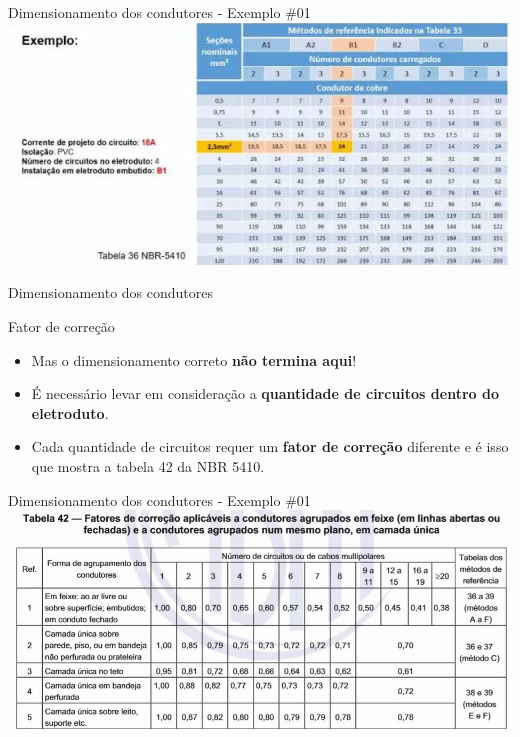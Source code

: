
\begin{frame}{Dimensionamento dos condutores - Exemplo \#01}
	\centering
	\includegraphics[width=1\linewidth]{Figuras/Ch06/fig6}
\end{frame}


\begin{frame}{Dimensionamento dos condutores}
	\begin{block}{Fator de correção}
		\begin{itemize}
			\item Mas o dimensionamento correto \textbf{não termina aqui}!
			\item É necessário levar em consideração a \textbf{quantidade de circuitos dentro do eletroduto}.
			\item Cada quantidade de circuitos requer um \textbf{fator de correção} diferente e é isso que mostra a tabela 42 da NBR 5410.
		\end{itemize}
	\end{block}
\end{frame}


\begin{frame}{Dimensionamento dos condutores - Exemplo \#01}
	\centering
	\includegraphics[width=1\linewidth]{Figuras/Ch06/fig5}
\end{frame}


